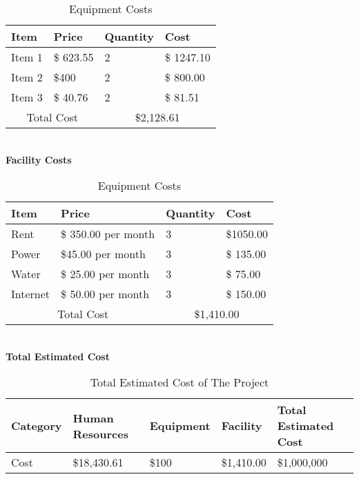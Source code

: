 \begin{table}[h]
    \begin{tabular}{||m{}|m{}|m{}|m{}||}
        \hline
        Item & Price & Quantity & Cost\\
        \hline
        Item 1 &  \$ 623.55 & 2 & \$ 1247.10\\ 
        \hline
        Item 2 & \$400 & 2 & \$ 800.00 \\
        Item 3 & \$ 40.76 & 2 & \$ 81.51\\ 
        \hline
        \multicolumn{2}{||c|}{Total Cost} & \multicolumn{2}{c||}{\$2,128.61}\\
        \hline
       \end{tabular}
       \caption {Equipment Costs}
       \label{table:4}
\end{table}\\
\textbf{Facility Costs}\\
\begin{table}[h]
    \begin{tabular}{||m{}|m{}|m{}|m{}||}
        \hline
        Item & Price & Quantity & Cost\\
        \hline
        Rent &  \$ 350.00 per month & 3 & \$1050.00\\ 
        \hline
        Power & \$45.00 per month & 3 & \$ 135.00 \\
        Water & \$ 25.00 per month & 3 & \$ 75.00\\ 
        Internet& \$ 50.00 per month & 3 & \$ 150.00\\ 
        \hline
        \multicolumn{2}{||c|}{Total Cost} & \multicolumn{2}{c||}{\$1,410.00}\\
        \hline
       \end{tabular}
       \caption {Equipment Costs}
       \label{table:5}
\end{table}\\
\textbf{Total Estimated Cost}\\
\begin{table}[h]
    \begin{tabular}{||m{}|m{}|m{}|m{}|m{}||}
        \hline
        Category & Human Resources & Equipment & Facility & Total Estimated Cost\\
        \hline
        Cost & \$18,430.61 & \$100 & \$1,410.00 & \$1,000,000\\
        \hline
    \end{tabular}
    \caption {Total Estimated Cost of The Project}
       \label{table:6}
\end{table}